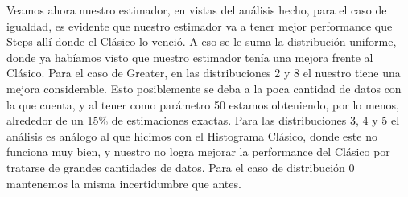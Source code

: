 Veamos ahora nuestro estimador, en vistas del análisis hecho, para el caso de igualdad, es evidente que nuestro estimador va a tener mejor performance que Steps allí donde el Clásico lo venció. A eso se le suma la distribución uniforme, donde ya habíamos visto que nuestro estimador tenía una mejora frente al Clásico.
Para el caso de Greater, en las distribuciones 2 y 8 el nuestro tiene una mejora considerable. Esto posiblemente se deba a la poca cantidad de datos con la que cuenta, y al tener como parámetro 50 estamos obteniendo, por lo menos, alrededor de un 15\% de estimaciones exactas. Para las distribuciones 3, 4 y 5 el análisis es análogo al que hicimos con el Histograma Clásico, donde este no funciona muy bien, y nuestro no logra mejorar la performance del Clásico por tratarse de grandes cantidades de datos. Para el caso de distribución 0 mantenemos la misma incertidumbre que antes.
